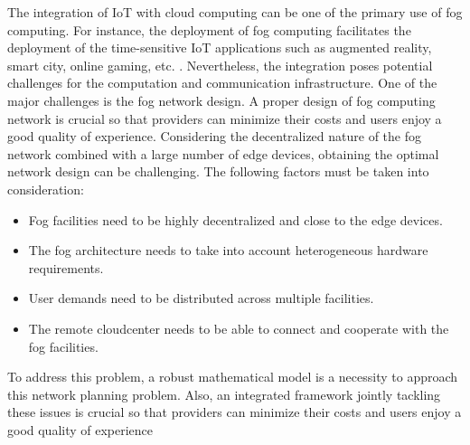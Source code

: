 \documentclass[10pt,journal,compsoc]{IEEEtran}
\begin{document}
The integration of IoT with cloud computing can be one of the primary use of fog computing. For instance, the deployment of fog computing facilitates the deployment of the time-sensitive IoT applications such as augmented reality\cite{al2017energy}, smart city\cite{taleb2017mobile}, online gaming\cite{chen2016efficient}, etc.\cite{hong2013mobile,orsini2015computing,stojmenovic2014fog,zhu2013improving}
. Nevertheless, the integration poses potential challenges for the computation and communication infrastructure. One of the major challenges is the fog network design. A proper design of fog computing network is crucial so that providers can minimize their costs and users enjoy a good quality of experience. Considering the decentralized nature of the fog network combined with a large number of edge devices, obtaining the optimal network design can be challenging. The following factors must be taken into consideration:
\begin{itemize}
\item Fog facilities need to be highly decentralized and close to the edge devices.
\item The fog architecture needs to take into account heterogeneous hardware requirements.
\item User demands need to be distributed across multiple facilities.
\item The remote cloudcenter needs to be able to connect and cooperate with the fog facilities.
\end{itemize}

To address this problem, a robust mathematical model is a necessity to approach this network planning problem. Also, an integrated framework jointly tackling these issues is crucial so that providers can minimize their costs and users enjoy a good quality of experience


\end{document}
